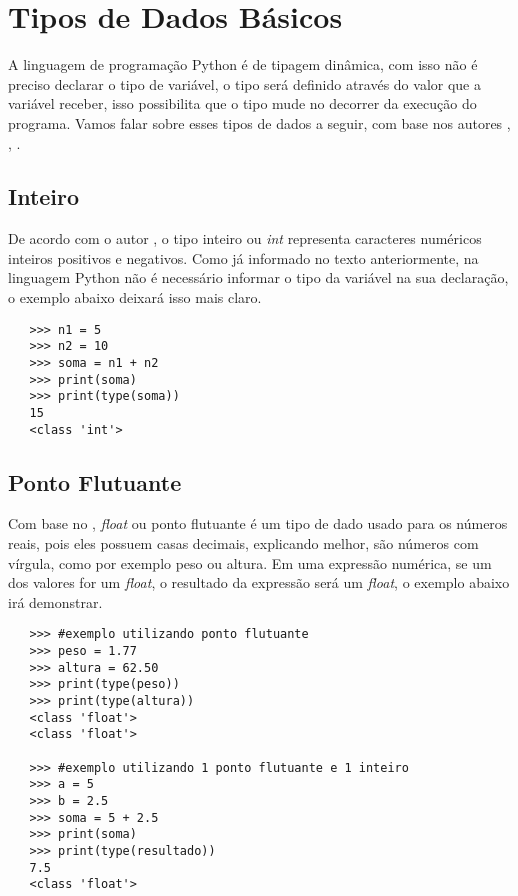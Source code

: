     \section{Tipos de Dados Básicos}
	A linguagem de programação Python é de tipagem dinâmica, com isso não é preciso declarar o tipo de variável, o tipo será definido através do valor que a variável receber, isso possibilita que o tipo mude no decorrer da execução do programa. Vamos falar sobre esses tipos de dados a seguir, com base nos autores \cite{Lutz2007}, \cite{Perkovic2016}, \cite{Severance2016}.
	
			\subsection{Inteiro}
			De acordo com o autor \cite{Perkovic2016}, o tipo inteiro ou \textit{int} representa caracteres numéricos inteiros positivos e negativos. Como já informado no texto anteriormente, na linguagem Python não é necessário informar o tipo da variável na sua declaração, o exemplo abaixo deixará isso mais claro.
			\begin{lstlisting}
   >>> n1 = 5
   >>> n2 = 10
   >>> soma = n1 + n2
   >>> print(soma)	
   >>> print(type(soma))		
   15
   <class 'int'>
			\end{lstlisting}
		
			\subsection{Ponto Flutuante}
			Com base no \cite{Perkovic2016}, \textit{float} ou ponto flutuante é um tipo de dado usado para os números reais, pois eles possuem casas decimais, explicando melhor, são números com vírgula, como por exemplo peso ou altura. Em uma expressão numérica, se um dos valores for um \textit{float}, o resultado da expressão será um \textit{float}, o exemplo abaixo irá demonstrar.
			\begin{lstlisting}
   >>> #exemplo utilizando ponto flutuante
   >>> peso = 1.77
   >>> altura = 62.50
   >>> print(type(peso))
   >>> print(type(altura))
   <class 'float'>
   <class 'float'>
   
   >>> #exemplo utilizando 1 ponto flutuante e 1 inteiro
   >>> a = 5
   >>> b = 2.5
   >>> soma = 5 + 2.5
   >>> print(soma)
   >>> print(type(resultado))
   7.5
   <class 'float'>
			\end{lstlisting}
		
